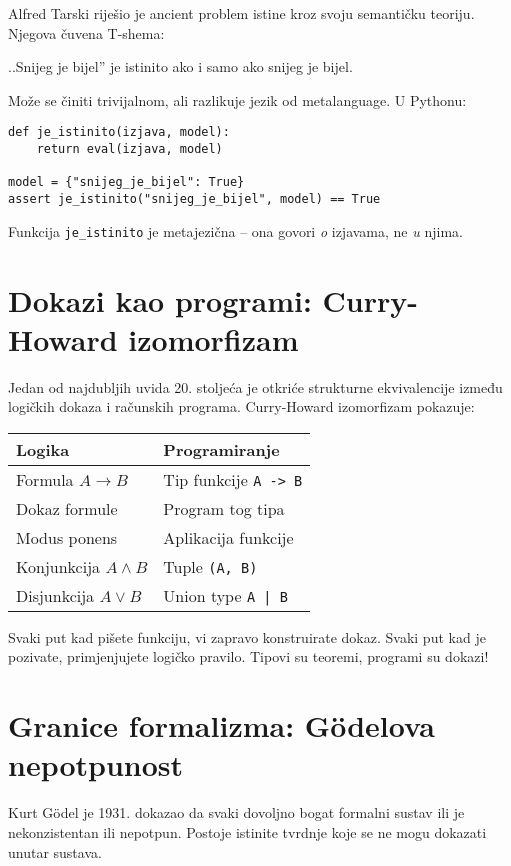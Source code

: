 Alfred Tarski riješio je ancient problem istine kroz svoju semantičku teoriju. Njegova čuvena T-shema:


..Snijeg je bijel'' je istinito ako i samo ako snijeg je bijel.


Može se činiti trivijalnom, ali razlikuje jezik od metalanguage. U Pythonu:
\begin{verbatim}
def je_istinito(izjava, model):
    return eval(izjava, model)

model = {"snijeg_je_bijel": True}
assert je_istinito("snijeg_je_bijel", model) == True
\end{verbatim}


Funkcija \texttt{je\_istinito} je metajezična -- ona govori \emph{o} izjavama, ne \emph{u} njima.


\section{Dokazi kao programi: Curry-Howard izomorfizam}


Jedan od najdubljih uvida 20. stoljeća je otkriće strukturne ekvivalencije između logičkih dokaza i računskih programa. Curry-Howard izomorfizam pokazuje:


\begin{center}
\begin{tabular}{l|l}
\textbf{Logika} & \textbf{Programiranje} \\
\hline
Formula $A \rightarrow B$ & Tip funkcije \texttt{A -> B} \\
Dokaz formule & Program tog tipa \\
Modus ponens & Aplikacija funkcije \\
Konjunkcija $A \wedge B$ & Tuple \texttt{(A, B)} \\
Disjunkcija $A \vee B$ & Union type \texttt{A | B} \\
\end{tabular}
\end{center}


Svaki put kad pišete funkciju, vi zapravo konstruirate dokaz. Svaki put kad je pozivate, primjenjujete logičko pravilo. Tipovi su teoremi, programi su dokazi!


\section{Granice formalizma: Gödelova nepotpunost}


Kurt Gödel je 1931. dokazao da svaki dovoljno bogat formalni sustav ili je nekonzistentan ili nepotpun. Postoje istinite tvrdnje koje se ne mogu dokazati unutar sustava.


